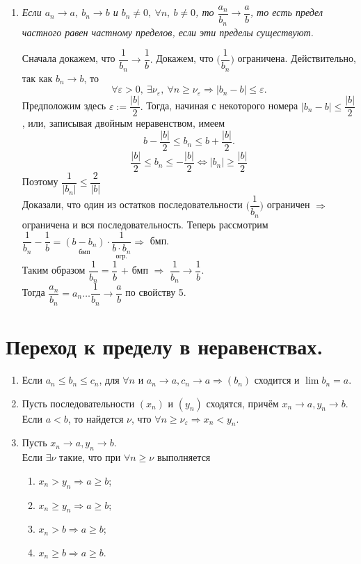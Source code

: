 \begin{enumerate}
\begin{Proof}
	\end{Proof}
	\item \textit{Если $a_n \to a,\ b_n \to b$ и $b_n \neq 0,\ \forall n ,\ b \neq 0$, то $\dfrac {a_n}{b_n} \to \dfrac {a} {b} $, то есть предел частного равен частному пределов, если эти пределы существуют.}
	\begin{Proof}
		Сначала докажем, что $\dfrac {1}{b_n} \to \dfrac {1}{b}.$ Докажем, что $\Big(\dfrac {1}{b_n}\Big)$ ограничена. Действительно, так как $b_n \to b$, то $$\forall \varepsilon > 0,\ \exists \nu_\varepsilon,\ \forall n \geqslant \nu_\varepsilon \Rightarrow |b_n - b| \leqslant \varepsilon.$$
		Предположим здесь $\varepsilon:=\dfrac{|b|}{2}.$ Тогда, начиная с некоторого номера $|b_n-b|\leqslant\dfrac{|b|}{2}$, или, записывая двойным неравенством, имеем $$b-\dfrac{|b|}{2}\leqslant b_n\leqslant b+\dfrac{|b|}{2}.$$
		$$\dfrac {|b|}{2}\leqslant b_n \leqslant -\dfrac {|b|}{2} \Longleftrightarrow |b_n| \geqslant \dfrac {|b|}{2} $$
		Поэтому $\dfrac {1}{|b_n|} \leqslant \dfrac {2}{|b|}$\\
		Доказали, что один из остатков последовательности $\Big(\dfrac {1}{b_n}\Big)$ ограничен $\Rightarrow$ ограничена и вся последовательность.
		Теперь рассмотрим $\dfrac {1}{b_n} - \dfrac {1}{b}=\underset{\text{бмп}}{(b-b_n)}\cdot\dfrac {1}{\underset{\text{огр.}}{b\cdot b_n}} \Rightarrow$ бмп.\\
		Таким образом $\dfrac {1}{b_n} = \dfrac {1}{b}$ + бмп $\Rightarrow$ $\dfrac {1}{b_n} \to \dfrac {1}{b}$.\\
		Тогда $\dfrac {a_n}{b_n}=a_n\dots\dfrac {1}{b_n}\to \dfrac {a}{b}$ по свойству 5.
	\end{Proof}
\end{enumerate}
\section{Переход к пределу в неравенствах.}
\begin{lem}
	\begin{enumerate}
		\item Если $a_n\leqslant b_n \leqslant c_n$, для $\forall n $ и $a_n \to a, c_n \to a \Rightarrow (b_n)$ сходится и $\lim b_n = a$.
		\item  Пусть последовательности $(x_n)$ и $(y_n)$ сходятся, причём $x_n \to a, y_n \to b$. Если $a<b$, то найдется $\nu$, что $\forall n \geqslant \nu_\varepsilon \Rightarrow x_n < y_n$.
		\item Пусть $x_n \to a, y_n \to b$.\\
		Если $\exists\nu$ такие, что при $\forall n \geqslant\nu$ выполняется\begin{enumerate}
			\item $x_n>y_n\Rightarrow a \geqslant b$;
			\item $x_n \geqslant y_n\Rightarrow a \geqslant b$;
			\item $x_n>b\Rightarrow a \geqslant b$;
			\item $x_n\geqslant b \Rightarrow a \geqslant b$.
		\end{enumerate}
	\end{enumerate}
\end{lem}


